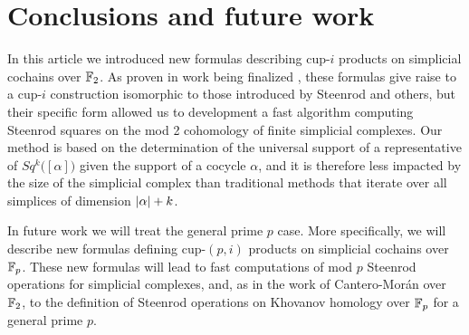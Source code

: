 
\section{Conclusions and future work} \label{s:conclusion}

In this article we introduced new formulas describing cup-$i$ products on simplicial cochains over ${\mathbb{F}_2}$.
As proven in work being finalized \cite{medina2022axiomatic}, these formulas give raise to a cup-$i$ construction isomorphic to those introduced by Steenrod and others, but their specific form allowed us to development a fast algorithm computing Steenrod squares on the mod 2 cohomology of finite simplicial complexes.
Our method is based on the determination of the universal support of a representative of $Sq^k\big( [\alpha] \big)$ given the support of a cocycle $\alpha$, and it is therefore less impacted by the size of the simplicial complex than traditional methods that iterate over all simplices of dimension $\lvert\alpha\rvert + k$.

In future work we will treat the general prime $p$ case.
More specifically, we will describe new formulas defining cup-$(p,i)$ products on simplicial cochains over ${\mathbb{F}_p}$.
These new formulas will lead to fast computations of mod $p$ Steenrod operations for simplicial complexes, and, as in the work of Cantero-Mor\'an \cite{cantero-moran2020khovanov} over ${\mathbb{F}_2}$, to the definition of Steenrod operations on Khovanov homology over ${\mathbb{F}_p}$ for a general prime $p$.
